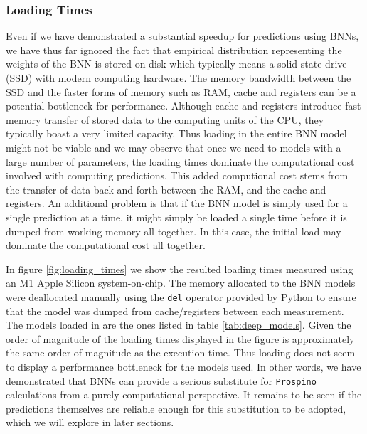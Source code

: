 \subsubsection{Loading Times}
Even if we have demonstrated a substantial speedup for predictions using BNNs, we have thus far ignored the fact that empirical distribution representing the weights of the BNN is stored on disk which typically means a solid state drive (SSD) with modern computing hardware. The memory bandwidth between the SSD and the faster forms of memory such as RAM, cache and registers can be a potential bottleneck for performance. Although cache and registers introduce fast memory transfer of stored data to the computing units of the CPU, they typically boast a very limited capacity. Thus loading in the entire BNN model might not be viable and we may observe that once we need to models with a large number of parameters, the loading times dominate the computational cost involved with computing predictions. This added computional cost stems from the transfer of data back and forth between the RAM, and the cache and registers. An additional problem is that if the BNN model is simply used for a single prediction at a time, it might simply be loaded a single time before it is dumped from working memory all together. In this case, the initial load may dominate the computational cost all together. 

In figure \ref{fig:loading_times} we show the resulted loading times measured using an M1 Apple Silicon system-on-chip. The memory allocated to the BNN models were deallocated manually using the {\tt del} operator provided by Python to ensure that the model was dumped from cache/registers between each measurement. The models loaded in are the ones listed in table \ref{tab:deep_models}. Given the order of magnitude of the loading times displayed in the figure is approximately the same order of magnitude as the execution time. Thus loading does not seem to display a performance bottleneck for the models used. In other words, we have demonstrated that BNNs can provide a serious substitute for {\tt Prospino} calculations from a purely computational perspective. It remains to be seen if the predictions themselves are reliable enough for this substitution to be adopted, which we will explore in later sections.

